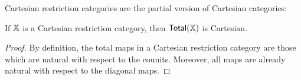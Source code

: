 Cartesian restriction categories are the partial version of Cartesian categories:
\begin{lemma} 
\label{prop:cartesian}
If $\mathbb{X}$ is a  Cartesian restriction category, then  $\mathsf{Total}(\mathbb{X})$ is Cartesian.
\end{lemma}
\begin{proof}
By definition, the total maps in a Cartesian restriction category are those which are natural with respect to the counits. Moreover, all maps are already natural with respect to the diagonal maps.
\end{proof}
%
%
%
%
%
%
%
%
%
%
%
%
%
%
%
%
%
